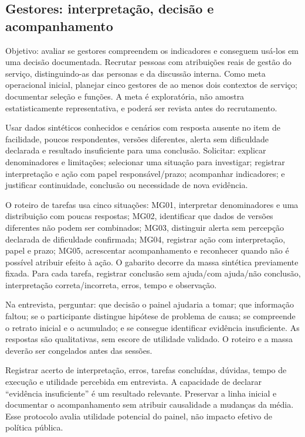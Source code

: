 \begin{apendicesenv}
\section{Gestores: interpretação, decisão e acompanhamento}
\label{sec:K.2}

Objetivo: avaliar se gestores compreendem os indicadores e conseguem usá-los em uma decisão documentada. Recrutar pessoas com atribuições reais de gestão do serviço, distinguindo-as das personas e da discussão interna. Como meta operacional inicial, planejar cinco gestores de ao menos dois contextos de serviço; documentar seleção e funções. A meta é exploratória, não amostra estatisticamente representativa, e poderá ser revista antes do recrutamento.

Usar dados sintéticos conhecidos e cenários com resposta ausente no item de facilidade, poucos respondentes, versões diferentes, alerta sem dificuldade declarada e resultado insuficiente para uma conclusão. Solicitar: explicar denominadores e limitações; selecionar uma situação para investigar; registrar interpretação e ação com papel responsável/prazo; acompanhar indicadores; e justificar continuidade, conclusão ou necessidade de nova evidência.

O roteiro de tarefas usa cinco situações: MG01, interpretar denominadores e uma distribuição com poucas respostas; MG02, identificar que dados de versões diferentes não podem ser combinados; MG03, distinguir alerta sem percepção declarada de dificuldade confirmada; MG04, registrar ação com interpretação, papel e prazo; MG05, acrescentar acompanhamento e reconhecer quando não é possível atribuir efeito à ação. O gabarito decorre da massa sintética previamente fixada. Para cada tarefa, registrar conclusão sem ajuda/com ajuda/não conclusão, interpretação correta/incorreta, erros, tempo e observação.

Na entrevista, perguntar: que decisão o painel ajudaria a tomar; que informação faltou; se o participante distingue hipótese de problema de causa; se compreende o retrato inicial e o acumulado; e se consegue identificar evidência insuficiente. As respostas são qualitativas, sem escore de utilidade validado. O roteiro e a massa deverão ser congelados antes das sessões.

Registrar acerto de interpretação, erros, tarefas concluídas, dúvidas, tempo de execução e utilidade percebida em entrevista. A capacidade de declarar ``evidência insuficiente'' é um resultado relevante. Preservar a linha inicial e documentar o acompanhamento sem atribuir causalidade a mudanças da média. Esse protocolo avalia utilidade potencial do painel, não impacto efetivo de política pública.


\end{apendicesenv}
